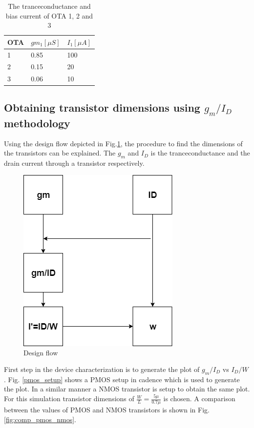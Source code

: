 \begin{table}[h]
\centering
\caption{The tranceconductance and bias current of OTA 1, 2 and 3}
\label{step_1}
\begin{tabular}{|l|l|l|}
\hline
OTA & $gm_1[\mu S]$ & $I_1[\mu A]$ \\ \hline
1   & 0.85  & 100  \\ \hline
2   & 0.15  & 20   \\ \hline
3   & 0.06   & 10   \\ \hline
\end{tabular}
\end{table}

\subsection{Obtaining transistor dimensions using $g_m/I_D$ methodology}

Using the design flow depicted in Fig.\ref{design_slow}, the procedure to find the dimensions of the transistors can be explained. The $g_m$ and $I_D$ is the tranceconductance and the drain current through a transistor respectively. 

\begin{figure}[H]
\centering
\includegraphics[scale = 0.45]{images/design_flow.png}
\caption{Design flow}
\label{design_slow}
\end{figure}

First step in the device characterization is to generate the plot of $g_m/I_D$ vs $I_D/W$. Fig.
\ref{pmos_setup} shows a PMOS setup in cadence which is used to generate the plot. In a similar manner a NMOS transistor is setup to obtain the same plot. For this simulation transistor dimensions of $\frac{W}{L} = \frac{5\mu}{0.7\mu}$ is chosen. A comparison between the values of PMOS and NMOS transistors is shown in Fig. \ref{fig:comp_pmos_nmos}.

